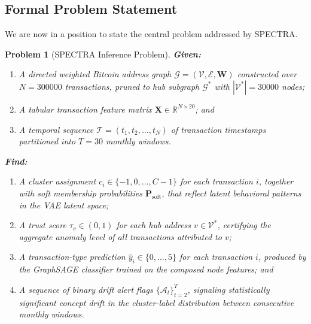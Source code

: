 \documentclass[journal]{IEEEtran}
\newtheorem{problem}{Problem}[section]
\begin{document}
\subsection{Formal Problem Statement}
\label{subsec:problem}

We are now in a position to state the central problem addressed by SPECTRA.

\begin{mdframed}[linewidth=0.8pt, innertopmargin=8pt, innerbottommargin=8pt,
                 innerleftmargin=10pt, innerrightmargin=10pt]
\begin{problem}[SPECTRA Inference Problem]
\label{prob:spectra}
\textbf{Given:}
\begin{enumerate}
  \item A directed weighted Bitcoin address graph
        $\mathcal{G}=(\mathcal{V},\mathcal{E},\mathbf{W})$
        constructed over $N=\num{300000}$ transactions, pruned to
        hub subgraph $\mathcal{G}^{*}$ with $|\mathcal{V}^{*}|=\num{30000}$
        nodes;
  \item A tabular transaction feature matrix
        $\mathbf{X}\in\mathbb{R}^{N\times 20}$; and
  \item A temporal sequence $\mathcal{T} = (t_{1}, t_{2}, \ldots, t_{N})$
        of transaction timestamps partitioned into $T=30$ monthly windows.
\end{enumerate}

\medskip
\textbf{Find:}
\begin{enumerate}
  \item[\textbf{(F1)}] A cluster assignment
        $c_{i}\in\{-1,0,\ldots,C-1\}$ for each transaction $i$, together
        with soft membership probabilities $\mathbf{P}_{\mathrm{soft}}$,
        that reflect latent behavioral patterns in the VAE latent space;
  \item[\textbf{(F2)}] A trust score $\tau_{v}\in(0,1)$ for each hub address
        $v\in\mathcal{V}^{*}$, certifying the aggregate anomaly level of
        all transactions attributed to $v$;
  \item[\textbf{(F3)}] A transaction-type prediction
        $\hat{y}_{i}\in\{0,\ldots,5\}$ for each transaction $i$, produced
        by the GraphSAGE classifier trained on the composed node features;
        and
  \item[\textbf{(F4)}] A sequence of binary drift alert flags
        $\{\mathcal{A}_{t}\}_{t=2}^{T}$, signaling statistically significant
        concept drift in the cluster-label distribution between consecutive
        monthly windows.
\end{enumerate}


\end{problem}
\end{mdframed}
\end{document}
